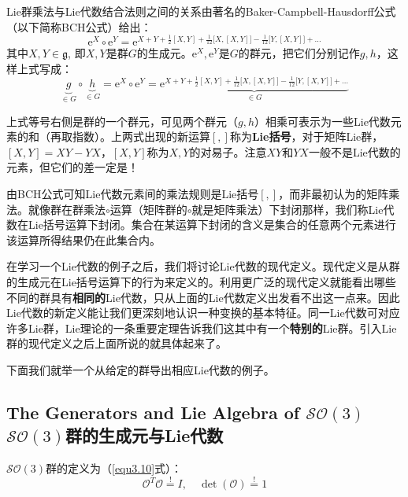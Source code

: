 Lie群乘法与Lie代数结合法则之间的关系由著名的Baker-Campbell-Hausdorff公式（以下简称BCH公式）给出：
\begin{equation}
\label{equ3.56}
\mathrm{e}^X \circ \mathrm{e}^Y = \mathrm{e}^{X + Y + \frac{1}{2}[X, Y] + \frac{1}{12} \big[X, [X, Y]\big] - \frac{1}{12} \big[Y, [X, Y]\big] + \dots  }
\end{equation}
其中$X, Y \in \mathfrak{g}$, 即$X, Y$是群$G$的生成元。$\mathrm{e}^X, \mathrm{e}^Y$是$G$的群元，把它们分别记作$g, h$，这样上式写成：
\begin{equation}
\label{sec3.57}
\underbrace{g}_{\in G} \circ \underbrace{h}_{\in G} = \mathrm{e}^X \circ \mathrm{e}^Y = \underbrace{\mathrm{e}^{ X + Y + \frac{1}{2} [X, Y] + \frac{1}{12}\big[X, [X, Y]\big] - \frac{1}{12} \big[Y, [X, Y]\big] + \dots }}_{\in G}
\end{equation}

上式等号右侧是群的一个群元，可见两个群元（$g,h$）相乘可表示为一些Lie代数元素的和（再取指数）。上两式出现的新运算$[,]$称为{\bf Lie括号}，对于矩阵Lie群，$[X, Y] = XY - YX$，$[X, Y]$称为$X, Y$的对易子。注意$XY$和$YX$一般不是Lie代数的元素，但它们的差一定是！

由BCH公式可知Lie代数元素间的乘法规则是Lie括号$[,]$，而非最初认为的矩阵乘法。就像群在群乘法$\circ$运算（矩阵群的$\circ$就是矩阵乘法）下封闭那样，我们称Lie代数在Lie括号运算下封闭。集合在某运算下封闭的含义是集合的任意两个元素进行该运算所得结果仍在此集合内。

在学习一个Lie代数的例子之后，我们将讨论Lie代数的现代定义。现代定义是从群的生成元在Lie括号运算下的行为来定义的。利用更广泛的现代定义就能看出哪些不同的群具有{\bf 相同的}Lie代数，只从上面的Lie代数定义出发看不出这一点来。因此Lie代数的新定义能让我们更深刻地认识一种变换的基本特征。同一Lie代数可对应许多Lie群，Lie理论的一条重要定理告诉我们这其中有一个{\bf 特别的}Lie群。引入Lie群的现代定义之后上面所说的就具体起来了。

下面我们就举一个从给定的群导出相应Lie代数的例子。

\subsection[$\mathcal{SO}(3)$群的生成元与Lie代数]{The Generators and Lie Algebra of $\mathcal{SO}(3)$\quad $\mathcal{SO}(3)$群的生成元与Lie代数}
\label{sec3.4.1}
$\mathcal{SO}(3)$群的定义为（\ref{equ3.10}式）：
\begin{equation}
\label{equ3.58}
\mathcal{O}^T \mathcal{O} \stackrel{!}{=} I , \quad \det(\mathcal{O}) \stackrel{!}{=} 1
\end{equation}

